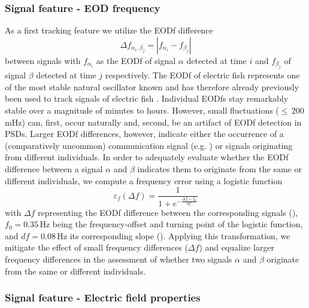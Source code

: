 \subsubsection{Signal feature - EOD frequency}
As a first tracking feature we utilize the EODf difference 
\begin{equation}\label{f_difference}
\Delta f_{\alpha_i, \beta_j} = | f_{\alpha_i} - f_{\beta_j} |
\end{equation}
between signals with $f_{\alpha_i}$ as the EODf of signal $\alpha$ detected at time $i$ and $f_{\beta_j}$ of signal $\beta$ detected at time $j$ respectively. The EODf of electric fish represents one of the most stable natural oscillator known \citep{Moortgat1998} and has therefore already previously been used to track signals of electric fish \citep{Henninger2020}. Individual EODfs stay remarkably stable over a magnitude of minutes to hours. However, small fluctuations ($\leq$\,200\,mHz) can, first, occur naturally and, second, be an artifact of EODf detection in PSDs. Larger EODf differences, however, indicate either the occurrence of a (comparatively uncommon) communication signal (e.g. \citealp{Zupanc2002, Triefenbach2008, Raab2021}) or signals originating from different individuals. In order to adequately evaluate whether the EODf difference between a signal $\alpha$ and $\beta$ indicates them to originate from the same or different individuals, we compute a frequency error using a logistic function 
\begin{equation}\label{errpr_eodf_eq}   
  \varepsilon_{f}(\Delta f) = \frac{1}{1 + e^{-\frac{\Delta f - f_0}{df}}}
\end{equation}
with $\Delta f$ representing the EODf difference between the corresponding signals (), $f_0 = 0.35$\,Hz being the frequency-offset and turning point of the logistic function, and $df = 0.08$\,Hz its corresponding slope (). Applying this transformation, we mitigate the effect of small frequency differences ($\Delta f$) and equalize larger frequency differences in the assessment of whether two signals $\alpha$ and $\beta$ originate from the same or different individuals. 

\subsubsection{Signal feature - Electric field properties}

